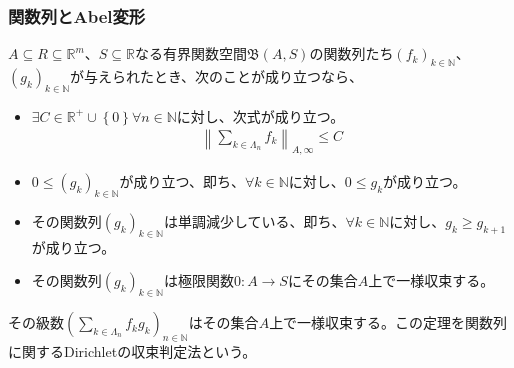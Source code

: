 \documentclass[dvipdfmx]{jsarticle}
\begin{document}
\subsubsection{関数列とAbel変形}%
\begin{thm}[関数列に関するDirichletの収束判定法]\label{4.1.11.20}
$A \subseteq R \subseteq \mathbb{R}^{m}$、$S \subseteq \mathbb{R}$なる有界関数空間$\mathfrak{B}(A,S)$の関数列たち$\left( f_{k} \right)_{k \in \mathbb{N}}$、$\left( g_{k} \right)_{k \in \mathbb{N}}$が与えられたとき、次のことが成り立つなら、
\begin{itemize}
\item
  $\exists C \in \mathbb{R}^{+} \cup \left\{ 0 \right\}\forall n \in \mathbb{N}$に対し、次式が成り立つ。
\begin{align*}
\left\| \sum_{k \in \varLambda_{n}} f_{k} \right\|_{A,\infty} \leq C
\end{align*}
\item
  $0 \leq \left( g_{k} \right)_{k \in \mathbb{N}}$が成り立つ、即ち、$\forall k \in \mathbb{N}$に対し、$0 \leq g_{k}$が成り立つ。
\item
  その関数列$\left( g_{k} \right)_{k \in \mathbb{N}}$は単調減少している、即ち、$\forall k \in \mathbb{N}$に対し、$g_{k} \geq g_{k + 1}$が成り立つ。
\item
  その関数列$\left( g_{k} \right)_{k \in \mathbb{N}}$は極限関数$0:A \rightarrow S$にその集合$A$上で一様収束する。
\end{itemize}
その級数$\left( \sum_{k \in \varLambda_{n}} {f_{k}g_{k}} \right)_{n \in \mathbb{N}}$はその集合$A$上で一様収束する。この定理を関数列に関するDirichletの収束判定法という。
\end{thm}
\end{document}
